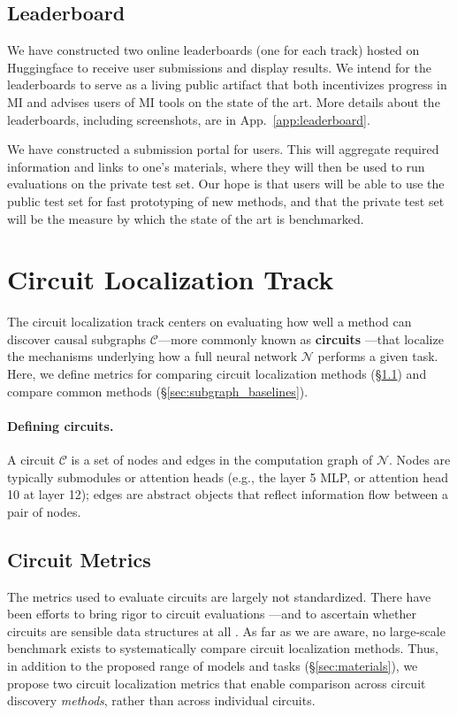 \documentclass{article}
\theoremstyle{plain}
\theoremstyle{definition}
\theoremstyle{remark}
\newcommand{\circuittrack}{circuit localization track}
\begin{document}
\subsection{Leaderboard}\label{ssec:leaderboard}
We have constructed two online leaderboards (one for each track) hosted on Huggingface to receive user submissions and display results. We intend for the leaderboards to serve as a living public artifact that both incentivizes progress in MI and advises users of MI tools on the state of the art. More details about the leaderboards, including screenshots, are in App.~\ref{app:leaderboard}.%

We have constructed a submission portal for users. This will aggregate required information and links to one's materials, where they will then be used to run evaluations on the private test set. Our hope is that users will be able to use the public test set for fast prototyping of new methods, and that the private test set will be the measure by which the state of the art is benchmarked.

\section{Circuit Localization Track}\label{sec:subgraph}

The \circuittrack{} centers on evaluating how well a method can discover causal subgraphs $\mathcal{C}$---more commonly known as \textbf{circuits} \citep{olah2020zoom}---that localize the mechanisms underlying how a full neural network $\mathcal{N}$ performs a given task. Here, we define metrics for comparing circuit localization methods (\S\ref{sec:subgraph_metrics}) and compare common methods (\S\ref{sec:subgraph_baselines}).

\paragraph{Defining circuits.} A circuit $\mathcal{C}$ is a set of nodes and edges in the computation graph of $\mathcal{N}$. Nodes are typically submodules or attention heads (e.g., the layer 5 MLP, or attention head 10 at layer 12); edges are abstract objects that reflect information flow between a pair of nodes.

\subsection{Circuit Metrics}\label{sec:subgraph_metrics} 
The metrics used to evaluate circuits are largely not standardized. There have been efforts to bring rigor to circuit evaluations \citep{miller2024transformer}---and to ascertain whether circuits are sensible data structures at all \citep{shi2024hypothesis}. As far as we are aware, no large-scale benchmark exists to systematically compare circuit localization methods. Thus, in addition to the proposed range of models and tasks (\S\ref{sec:materials}), we propose two circuit localization metrics that enable comparison across circuit discovery \emph{methods}, rather than across individual circuits.
\end{document}
